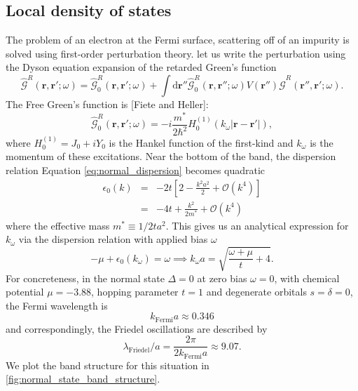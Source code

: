 \subsection{Local density of states}
The problem of an electron at the Fermi surface, scattering off of an impurity is solved using first-order perturbation theory.
let us write the perturbation using the Dyson equation expansion of the retarded Green's function
\begin{equation}
\hat{\mathcal{G}}^R(\mathbf{r},\mathbf{r}';\omega) = \hat{\mathcal{G}}^R_0(\mathbf{r},\mathbf{r}';\omega) + \int \text{d}\mathbf{r}'' \hat{\mathcal{G}}^R_0(\mathbf{r},\mathbf{r}'';\omega)V(\mathbf{r}'') \hat{\mathcal{G}}^R(\mathbf{r}'',\mathbf{r}';\omega).
\end{equation}
The Free Green's function is [Fiete and Heller]:
\begin{equation}
\hat{\mathcal{G}}^R_0(\mathbf{r},\mathbf{r}';\omega)=-i\frac{m^*}{2\hbar^2}H^{(1)}_0\left(k_\omega|\mathbf{r}-\mathbf{r}'|\right),
\end{equation}
where $H^{(1)}_0=J_0+iY_0$ is the Hankel function of the first-kind and $k_\omega$ is the momentum of these excitations.
Near the bottom of the band, the dispersion relation Equation \ref{eq:normal_dispersion} becomes quadratic
\begin{eqnarray}
\epsilon_0(k) &=& -2t\left[2-\frac{k^2a^2}{2}+\mathcal{O}(k^4)\right]\\
&=&
-4t+\frac{k^2}{2m^*}+\mathcal{O}(k^4)
\end{eqnarray}
where the effective mass $m^*\equiv1/2ta^2$.
This gives us an analytical expression for $k_\omega$ via the dispersion relation with applied bias $\omega$
\begin{equation}
-\mu +\epsilon_0(k_\omega) =\omega \implies k_\omega a = \sqrt{\frac{\omega+\mu}{t}+4}.
\end{equation}
For concreteness, in the normal state $\Delta=0$ at zero bias $\omega=0$, with chemical potential $\mu=-3.88$, hopping parameter $t=1$ and degenerate orbitals $s=\delta=0$, the Fermi wavelength is
\begin{equation}
k_\text{Fermi}a \approx 0.346
\end{equation}
and correspondingly, the Friedel oscillations are described by
\begin{equation}
\lambda_\text{Friedel}/a = \frac{2\pi}{2k_\text{Fermi}a} \approx  9.07.
\end{equation}
We plot the band structure for this situation in \ref{fig:normal_state_band_structure}.
